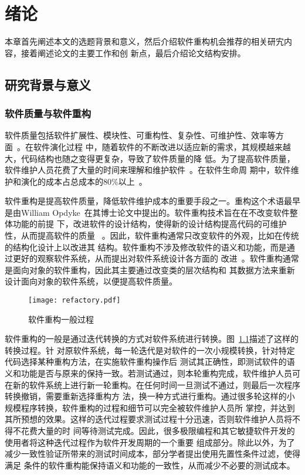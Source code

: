 
\chapter{绪论}
\label{chpt:introduction}
本章首先阐述本文的选题背景和意义，然后介绍软件重构机会推荐的相关研宄内容，接着阐述论文的主要工作和创
新点，最后介绍论文结构安排。

\section{研究背景与意义}

\subsection{软件质量与软件重构}
软件质量包括软件扩展性、模块性、可重构性、复杂性、可维护性、效率等方面~\cite{Boehm}。在软件演化过程
中，随着软件的不断改进以适应新的需求，其规模越来越大，代码结构也随之变得更复杂，导致了软件质量的降
低。为了提高软件质量，软件维护人员花费了大量的时间来理解和维护软件~\cite{Bansiya2002}。在软件生命周
期中，软件维护和演化的成本占总成本的80\%以上~\cite{guimaraes1983managing, coleman1994using}。

软件重构是提高软件质量，降低软件维护成本的重要手段之一。重构这个术语最早是由William
Opdyke~\cite{opdyke1992refactoring}在其博士论文中提出的。软件重构技术旨在在不改变软件整体功能的前提
下，改进软件的设计结构，使得新的设计结构提高代码的可维护性，从而提高软件的质量
~\cite{fowler1999refactoring}。因此，软件重构通常只改变软件的外观，比如在传统的结构化设计上以改进其
结构。软件重构不涉及修改软件的语义和功能，而是通过更好的观察软件系统，从而提出对软件系统设计各方面的
改进~\cite{chikofsky1990reverse}。软件重构通常是面向对象的软件重构，因此其主要通过改变类的层次结构和
其数据方法来重新设计面向对象的软件系统，以便提高软件质量。


\begin{figure}
  \centering
  \texttt{[image: refactory.pdf]}  
  \caption{\label{fig:refactory}软件重构一般过程}
\end{figure}

软件重构的一般是通过迭代转换的方式对软件系统进行转换。图~\ref{fig:refactory}描述了这样的转换过程。针
对原软件系统，每一轮迭代是对软件的一次小规模转换，针对特定代码选择某种重构方法，在实施软件重构操作后
测试其正确性，即测试软件的语义和功能是否与原来的保持一致。若测试通过，则本轮重构完成，软件维护人员可
在新的软件系统上进行新一轮重构。在任何时间一旦测试不通过，则最后一次程序转换撤销，需要重新选择重构方
法，换一种方式进行重构。通过很多轮这样的小规模程序转换，软件重构的过程和细节可以完全被软件维护人员所
掌控，并达到其所预想的效果。这样的迭代过程要求测试过程十分迅速，否则软件维护人员将不得不花费大量的时
间等待测试完成。因此，很多极限编程和其它敏捷软件开发的使用者将这种迭代过程作为软件开发周期的一个重要
组成部分。除此以外，为了减少一致性验证所带来的测试时间成本，部分学者提出使用先置性条件过滤，使得满足
条件的软件重构能保持语义和功能的一致性，从而减少不必要的测试成本。

